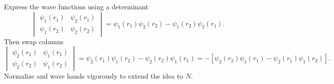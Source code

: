\documentclass{amsart}
\begin{document}
Express the wave functions using a determinant
\[
\begin{vmatrix} \psi_1(r_1)     & \psi_2(r_1) \\ 
\psi_1(r_2) & \psi_2(r_2) \end{vmatrix}=\psi_1(r_1) \psi_2(r_2) -\psi_1(r_2) \psi_2(r_1).
\]
Then swap columns
\[
\begin{vmatrix}  \psi_2(r_1) & \psi_1(r_1)\\  
\psi_2(r_2) & \psi_1(r_2)\end{vmatrix}= \psi_2(r_1)\psi_1(r_2)-\psi_2(r_2)\psi_1(r_1)=-[ \psi_2(r_2)\psi_1(r_1) - \psi_2(r_1)\psi_1(r_2)].
\]
Normalize and wave hands vigorously to extend the idea to $N$.
\end{document}
